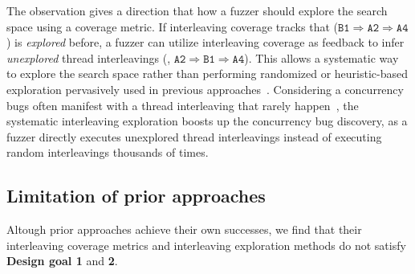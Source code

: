 %
The observation gives a direction that how a fuzzer should explore the
search space using a coverage metric.  If interleaving coverage tracks
that ($\texttt{B1} \Rightarrow \texttt{A2} \Rightarrow \texttt{A4}$)
is \textit{explored} before, a fuzzer can utilize interleaving
coverage as feedback to infer \textit{unexplored} thread interleavings
(\eg, $\texttt{A2} \Rightarrow \texttt{B1} \Rightarrow \texttt{A4}$).
%
This allows a systematic way to explore the search space rather than
performing randomized or heuristic-based exploration pervasively used
in previous approaches~\cite{ski, krace, pctalgorithm, muzz}.
%
Considering a concurrency bugs often manifest with a thread
interleaving that rarely happen~\cite{exprace}, the systematic
interleaving exploration boosts up the concurrency bug discovery, as a
fuzzer directly executes unexplored thread interleavings instead of
executing random interleavings thousands of times.


%


\subsection{Limitation of prior approaches}
\label{ss:existingapproaches}
%
%   

%
Altough prior approaches achieve their own successes, we find that
their interleaving coverage metrics and interleaving exploration
methods do not satisfy \textbf{Design goal 1} and \textbf{2}.


